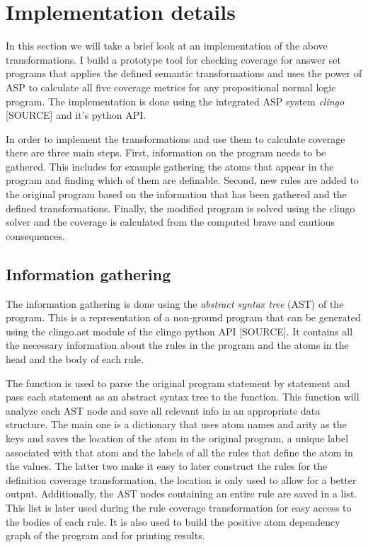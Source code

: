 \section{Implementation details}
\label{sec:Computing coverage metrics for propositional programs/Implementation details}
In this section we will take a brief look at an implementation of the above transformations. I build a prototype tool for checking coverage for answer set programs that applies the defined semantic transformations and uses the power of ASP to calculate all five coverage metrics for any propositional normal logic program. The implementation is done using the integrated ASP system \emph{clingo} [SOURCE] and it's python API. 

In order to implement the transformations and use them to calculate coverage there are three main steps. First, information on the program needs to be gathered. This includes for example gathering the atoms that appear in the program and finding which of them are definable. Second, new rules are added to the original program based on the information that has been gathered and the defined transformations. Finally, the modified program is solved using the clingo solver and the coverage is calculated from the computed brave and cautious consequences.

\subsection{Information gathering}
\label{subsec:Computing coverage metrics for propositional programs/Implementation details/Information gathering}
The information gathering is done using the \emph{abstract syntax tree} (AST) of the program. This is a representation of a non-ground program that can be generated using the clingo.ast module of the clingo python API [SOURCE]. It contains all the necessary information about the rules in the program and the atoms in the head and the body of each rule. 

The  function is used to parse the original program statement by statement and pass each statement as an abstract syntax tree to the  function. This function will analyze each AST node and save all relevant info in an appropriate data structure. The main one is a dictionary that uses atom names and arity as the keys and saves the location of the atom in the original program, a unique label associated with that atom and the labels of all the rules that define the atom in the values. The latter two make it easy to later construct the rules for the definition coverage transformation, the location is only used to allow for a better output. Additionally, the AST nodes containing an entire rule are saved in a list. This list is later used during the rule coverage transformation for easy access to the bodies of each rule. It is also used to build the positive atom dependency graph of the program and for printing results.

